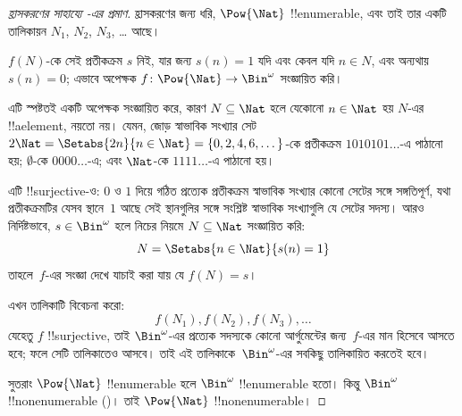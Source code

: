 \documentclass[../../../include/open-logic-section]{subfiles}
\begin{document}
\begin{proof}[হ্রাসকরণের সাহায্যে {}-এর প্রমাণ]
হ্রাসকরণের জন্য ধরি, $\Pow{\Nat}$ !!{enumerable}, এবং তাই তার একটি তালিকায়ন $N_{1}$, $N_{2}$, $N_{3}$, \dots{} আছে।

$f(N)$-কে সেই প্রতীকক্রম $s$ নিই, যার জন্য $s(n) = 1$ যদি এবং কেবল যদি $n \in N$, এবং অন্যথায় $s(n) = 0$; এভাবে অপেক্ষক $f \colon \Pow{\Nat} \to \Bin^\omega$ সংজ্ঞায়িত করি। 

এটি স্পষ্টতই একটি অপেক্ষক সংজ্ঞায়িত করে, কারণ $N \subseteq \Nat$ হলে যেকোনো $n \in \Nat$ হয় $N$-এর !!a{element}, নয়তো নয়। যেমন, জোড় স্বাভাবিক সংখ্যার সেট $2\Nat = \Setabs{2n}{n \in \Nat} = \{0,2, 4, 6,
\dots\}$-কে প্রতীকক্রম $1010101\dots$-এ পাঠানো হয়; $\emptyset$-কে $0000\dots$-এ; এবং $\Nat$-কে
$1111\dots$-এ পাঠানো হয়।

এটি !!{surjective}-ও: $0$ ও $1$ দিয়ে গঠিত প্রত্যেক প্রতীকক্রম স্বাভাবিক সংখ্যার কোনো সেটের সঙ্গে সঙ্গতিপূর্ণ, যথা প্রতীকক্রমটির যেসব স্থানে~$1$ আছে সেই স্থানগুলির সঙ্গে সংশ্লিষ্ট স্বাভাবিক সংখ্যাগুলি যে সেটের সদস্য। আরও নির্দিষ্টভাবে, $s \in \Bin^\omega$ হলে নিচের নিয়মে $N
\subseteq \Nat$ সংজ্ঞায়িত করি:
\[
N = \Setabs{n \in \Nat}{s(n) = 1}
\]
তাহলে~$f$-এর সংজ্ঞা দেখে যাচাই করা যায় যে $f(N) = s$।

এখন তালিকাটি বিবেচনা করো:
\[
f(N_1), f(N_2), f(N_3), \dots
\]
যেহেতু $f$ !!{surjective}, তাই $\Bin^\omega$-এর প্রত্যেক সদস্যকে কোনো আর্গুমেন্টের জন্য~$f$-এর মান হিসেবে আসতে হবে; ফলে সেটি তালিকাতেও আসবে। তাই এই তালিকাকে~$\Bin^\omega$-এর সবকিছু তালিকায়িত করতেই হবে।

সুতরাং $\Pow{\Nat}$ !!{enumerable} হলে $\Bin^\omega$ !!{enumerable} হতো। কিন্তু $\Bin^\omega$ !!{nonenumerable}
()। তাই $\Pow{\Nat}$ !!{nonenumerable}।
\end{proof}

\end{document}
